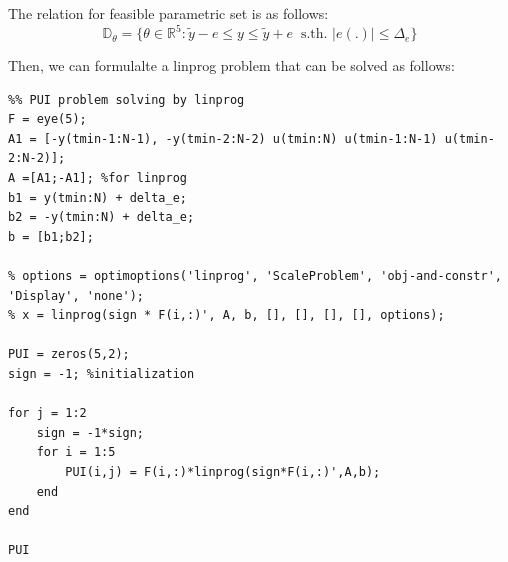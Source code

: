 The relation for feasible parametric set is as follows:
\[
\mathbb{D}_\theta = \{\theta \in \mathbb{R}^5: \tilde{y}-e \leq y \leq \tilde{y}+e \:\text{ s.th.   } |e(.)|\leq \Delta_e\} 
\]

Then, we can formulalte a linprog problem that can be solved as follows:
\begin{example}
\begin{lstlisting}[caption=Set-membership estimation with theta bounds and simulation]
%the rest of the code
%% PUI problem solving by linprog
F = eye(5);
A1 = [-y(tmin-1:N-1), -y(tmin-2:N-2) u(tmin:N) u(tmin-1:N-1) u(tmin-2:N-2)];
A =[A1;-A1]; %for linprog
b1 = y(tmin:N) + delta_e;
b2 = -y(tmin:N) + delta_e;
b = [b1;b2];

% options = optimoptions('linprog', 'ScaleProblem', 'obj-and-constr', 'Display', 'none');
% x = linprog(sign * F(i,:)', A, b, [], [], [], [], options);

PUI = zeros(5,2);
sign = -1; %initialization

for j = 1:2
    sign = -1*sign;
    for i = 1:5
        PUI(i,j) = F(i,:)*linprog(sign*F(i,:)',A,b);
    end
end

PUI

\end{lstlisting}
\end{example}

